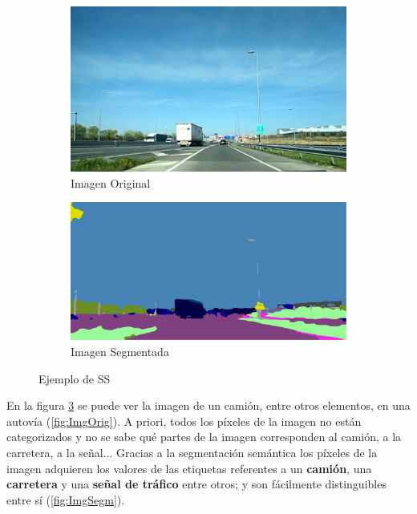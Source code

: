 \begin{figure}[H]
  \centering
  \begin{subfigure}[b]{0.45\linewidth}
    \includegraphics[width=\linewidth]{Figuras/Imagen_Original.eps}
    \caption{Imagen Original}
    \label{fig:Original}
  \end{subfigure}
    \begin{subfigure}[b]{0.5\linewidth}
    \includegraphics[width=\linewidth]{Figuras/Ejemplo_Imagen_Segmentada.eps}
    \caption{Imagen Segmentada}
    \label{fig:Segmentada}
  \end{subfigure}
  \caption{Ejemplo de \ac{SS}}
  \label{fig:SS}
\end{figure}

En la figura \ref{fig:SS} se puede ver la imagen de un camión, entre otros elementos, en una autovía (\ref{fig:ImgOrig}). A priori, todos los píxeles de la imagen no están categorizados y no se sabe qué partes de la imagen corresponden al camión, a la carretera, a la señal... Gracias a la segmentación semántica los píxeles de la imagen adquieren los valores de las etiquetas referentes a un \textbf{camión}, una \textbf{carretera} y una \textbf{señal de tráfico} entre otros; y son fácilmente distinguibles entre sí (\ref{fig:ImgSegm}). 

